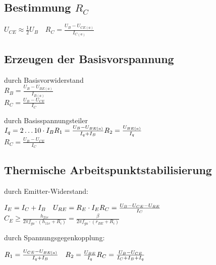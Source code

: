 \subsection{Bestimmung $R_C$}
$U_{CE}\approx \frac{1}{2}U_B\quad R_C=\frac{U_B-U_{CE(a)}}{I_{C(a)}}$

\subsection{Erzeugen der Basisvorspannung}
    \begin{minipage}{0.5\columnwidth}
        durch Basisvorwiderstand\\
        $R_B=\frac{U_B-U_{BE(a)}}{I_{B(a)}}$\\ %
        $R_C=\frac{U_B-U_{CE}}{I_C}$
    \end{minipage}
    \begin{minipage}{0.5\columnwidth}
    \end{minipage}

    \begin{minipage}{0.5\columnwidth}
        durch Basisspannungsteiler\\
        $I_q=2\dots 10\cdot I_B\\
        R_1=\frac{U_B-U_{BE(a)}}{I_q+I_B}\\
        R_2=\frac{U_{BE(a)}}{I_q}$\\
        $R_C=\frac{U_B-U_{CE}}{I_C}$
    \end{minipage}
    \begin{minipage}{0.5\columnwidth}
    \end{minipage}

\subsection{Thermische Arbeitspunktstabilisierung}
    \begin{minipage}{0.5\columnwidth}
        durch Emitter-Widerstand:
        
        $I_E=I_C+I_B\quad U_{RE}=R_E\cdot I_E\\
        R_C=\frac{U_B-U_{CE}-U_{RE}}{I_C}$\\ %
        $C_E\geq\frac{h_{21e}}{2\pi f_{gu}\cdot(h_{11e}+R_i)}=\frac{\beta}{2\pi f_{gu}\cdot(r_{BE}+R_i)}$ %
        
    \end{minipage}
    \begin{minipage}{0.5\columnwidth}
        durch Spannungsgegenkopplung:
        
        $R_1=\frac{U_{CE}-U_{BE(a)}}{I_q+I_B}\quad R_2=\frac{U_{BE}}{I_q}\\
        R_C=\frac{U_B-U_{CE}}{I_C+I_B+I_q}$ 
        
    \end{minipage}
